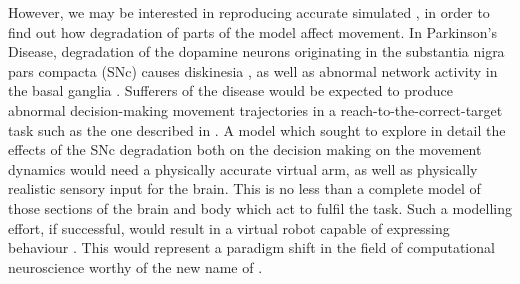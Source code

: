 \documentclass{frontiersSCNS}
\begin{document}
However,
we may be interested in reproducing accurate simulated ,
in order to find out how degradation of parts of the model affect
movement. In Parkinson's Disease, degradation of the
dopamine neurons originating in the substantia nigra pars compacta (SNc)
causes diskinesia \citep{galvan_pathophysiology_2008}, as well as
abnormal network activity in
the basal ganglia \citep{brown_dopamine_2001,mccarthy_striatal_2011}.
Sufferers of the disease would be
expected to produce abnormal decision-making  movement trajectories
in a reach-to-the-correct-target task such as the one described in
\cite{james_target-distractor_2017}.
%
A model which
sought to explore in detail the effects of the SNc degradation both on
the decision making  on the movement dynamics would need a
physically accurate virtual arm, as well as physically realistic sensory
input for the brain. This is no less than a complete model of those sections
of the brain and body which act to fulfil the task. Such a modelling
effort, if successful, would result in a virtual robot capable of expressing
behaviour . This would
represent a paradigm shift in the field of computational neuroscience
worthy of the new name of .



\end{document}
